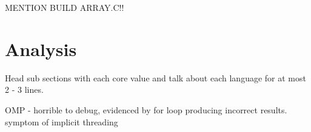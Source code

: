 \documentclass[11pt]{article} %
\begin{document}

MENTION BUILD ARRAY.C!!

\section{Analysis}


Head sub sections with each core value and talk about each language for at most 2 - 3 lines.

OMP - horrible to debug, evidenced by for loop producing incorrect results. symptom of implicit threading

%
%
\end{document}
